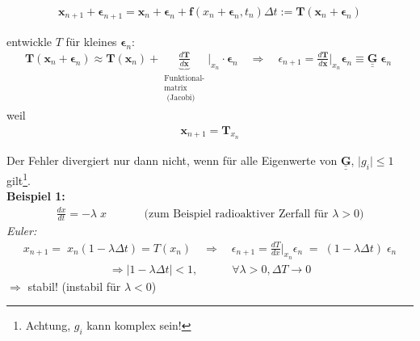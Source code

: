 \documentclass[12pt]{article}
\begin{document}
\begin{align}
\mathbf{x}_{n+1} + \boldsymbol{\epsilon}_{n+1} =\mathbf{x}_n + \boldsymbol{\epsilon}_n + \mathbf{f}( x_n + \boldsymbol{\epsilon}_n, t_n) \Delta t := \mathbf{T}(\mathbf{x}_n + \boldsymbol{\epsilon}_n)
\end{align} 

 entwickle $T$ für kleines $\boldsymbol{\epsilon}_n$: 
 \begin{align}
 \mathbf{T}(\mathbf{x}_n + \boldsymbol{\epsilon}_n) 
 \approx \mathbf{T}(\mathbf{x}_n) + \underbrace{\frac{d\mathbf{T}}{d\mathbf{x}}}_{ \substack{ \text{Funktional-} \\ \text{matrix} \\  \text{ (Jacobi)} }} \biggr\vert_{x_n} \cdot \boldsymbol{\epsilon}_n \quad
 \Rightarrow \quad \epsilon_{n+1} = \frac{d\mathbf{T}}{d\mathbf{x}}  \biggr\vert_{x_n} \boldsymbol{ \epsilon}_n  \equiv \underline{ \underline{\mathbf{G} }} \;  \boldsymbol{\epsilon}_n \; 
 \end{align}
 weil
 \begin{align*}
 \mathbf{x}_{n+1} = \mathbf{T}_{x_n}
 \end{align*}
 
Der Fehler divergiert nur dann nicht, wenn für alle Eigenwerte von $\underline{ \underline{\mathbf{G} }}$, $\vert g_i \vert \leq 1$ gilt\footnote{Achtung, $g_i$ kann komplex sein!}.
\\
\textbf{Beispiel 1: }
\begin{align*}
\frac{dx}{dt}= - \lambda \; x \quad \quad \quad \text{  (zum Beispiel radioaktiver Zerfall für } \lambda > 0)
 \end{align*}
 \textit{Euler:}
 \begin{align*}
 x_{n+1} = \;  x_n ( 1- \lambda \Delta t) = T (x_n) \quad
 \Rightarrow \quad \epsilon_{n+1} = \frac{dT}{dx} \biggr\vert _{x_n} \epsilon_n \; =\;  (1- \lambda \Delta t) \; \epsilon_n 
 \end{align*}
 \begin{align}
   \Rightarrow  \vert 1 - \lambda \Delta t \vert <1 , \quad \quad \quad \forall \lambda > 0, \Delta T \to 0
 \end{align}
$\Rightarrow$ stabil! (instabil für $\lambda < 0$) \\
\end{document}
